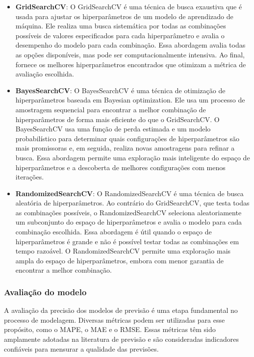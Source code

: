 \begin{itemize}
	\item \textbf{GridSearchCV}: O GridSearchCV é uma técnica de busca exaustiva que é usada para ajustar os hiperparâmetros de um modelo de aprendizado de máquina. Ele realiza uma busca sistemática por todas as combinações possíveis de valores especificados para cada hiperparâmetro e avalia o desempenho do modelo para cada combinação. Essa abordagem avalia todas as opções disponíveis, mas pode ser computacionalmente intensiva. Ao final, fornece os melhores hiperparâmetros encontrados que otimizam a métrica de avaliação escolhida.

\item \textbf{BayesSearchCV}: O BayesSearchCV é uma técnica de otimização de hiperparâmetros baseada em Bayesian optimization. Ele usa um processo de amostragem sequencial para encontrar a melhor combinação de hiperparâmetros de forma mais eficiente do que o GridSearchCV. O BayesSearchCV usa uma função de perda estimada e um modelo probabilístico para determinar quais configurações de hiperparâmetros são mais promissoras e, em seguida, realiza novas amostragens para refinar a busca. Essa abordagem permite uma exploração mais inteligente do espaço de hiperparâmetros e a descoberta de melhores configurações com menos iterações.

\item \textbf{RandomizedSearchCV}: O RandomizedSearchCV é uma técnica de busca aleatória de hiperparâmetros. Ao contrário do GridSearchCV, que testa todas as combinações possíveis, o RandomizedSearchCV seleciona aleatoriamente um subconjunto do espaço de hiperparâmetros e avalia o modelo para cada combinação escolhida. Essa abordagem é útil quando o espaço de hiperparâmetros é grande e não é possível testar todas as combinações em tempo razoável. O RandomizedSearchCV permite uma exploração mais ampla do espaço de hiperparâmetros, embora com menor garantia de encontrar a melhor combinação.
\end{itemize}

\subsubsection{Avalia\c c\~ao do modelo}


A avaliação da precisão dos modelos de previsão é uma etapa fundamental no processo de modelagem. Diversas métricas podem ser utilizadas para esse propósito, como o MAPE, o MAE e o RMSE. Essas métricas têm sido amplamente adotadas na literatura de previsão e são consideradas indicadores confiáveis para mensurar a qualidade das previsões.

